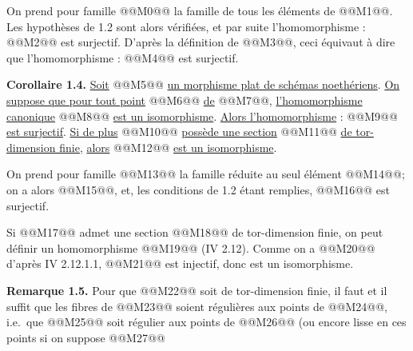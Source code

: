 
On
prend pour famille @@M0@@ la famille de tous les éléments de @@M1@@. Les hypothèses de 1.2 sont alors vérifiées, et par suite l'homomorphisme :
@@M2@@
est surjectif. D'après la définition de @@M3@@, ceci équivaut à dire que l'homomorphisme :
@@M4@@
est surjectif.

\textbf{Corollaire 1.4.} \uline{Soit} @@M5@@ \uline{un morphisme plat de schémas noethériens}. \uline{On suppose que pour tout point} @@M6@@ \uline{de} @@M7@@, \uline{l'homomorphisme canonique} @@M8@@ \uline{est un isomorphisme}. \uline{Alors l'homomorphisme} :
@@M9@@
\uline{est surjectif}. \uline{Si de plus} @@M10@@ \uline{possède une section} @@M11@@ \uline{de tor-dimension finie}, \uline{alors} @@M12@@ \uline{est un isomorphisme}.

On prend pour famille @@M13@@ la famille réduite au seul élément @@M14@@; on a alors @@M15@@, et, les conditions de 1.2 étant remplies, @@M16@@ est surjectif.

Si @@M17@@ admet une section @@M18@@ de tor-dimension finie, on peut définir un homomorphisme @@M19@@ (IV 2.12). Comme on a @@M20@@ d'après IV 2.12.1.1, @@M21@@ est injectif, donc est un isomorphisme.

\textbf{Remarque 1.5.} Pour que @@M22@@ soit de tor-dimension finie, il faut et il suffit que les fibres de @@M23@@ soient régulières aux points de @@M24@@, i.e.\ que @@M25@@ soit régulier aux points de @@M26@@ (ou encore lisse en ces points si on suppose @@M27@@
